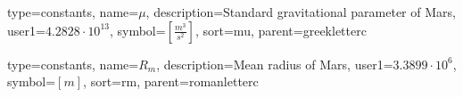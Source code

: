 {
type=constants, %
name={\ensuremath{\mu}}, %
description={Standard gravitational parameter of Mars}, %
user1={$4.2828\cdot 10^{13}$}, %
symbol={$\left[\frac{m^3}{s^{2}}\right]$}, %
sort=mu, %
parent=greekletterc %
}

{
type=constants, %
name={\ensuremath{R_m}}, %
description={Mean radius of Mars}, %
user1={$3.3899\cdot 10^{6}$}, %
symbol={$\left[m\right]$}, %
sort=rm, %
parent=romanletterc %
}